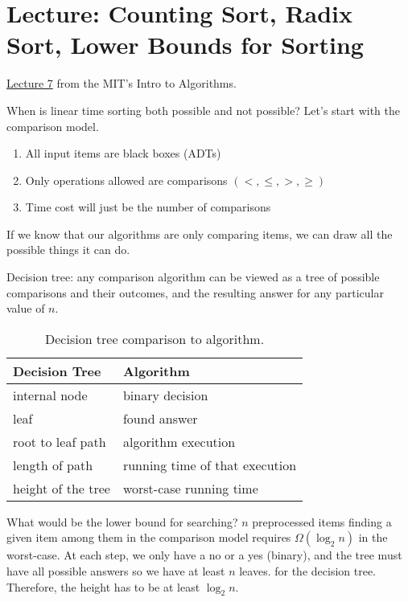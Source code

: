 \chapter{Lecture: Counting Sort, Radix Sort, Lower Bounds for Sorting}
\href{https://ocw.mit.edu/courses/electrical-engineering-and-computer-science/6-006-introduction-to-algorithms-fall-2011/lecture-videos/lecture-7-counting-sort-radix-sort-lower-bounds-for-sorting/}{Lecture 7} 
from the MIT's  Intro to Algorithms.

When is linear time sorting both possible and not possible? Let's start with the comparison model.
\begin{enumerate}[label=$\ast$]
	\item All input items are black boxes (ADTs)
	\item Only operations allowed are comparisons \((<, \leq, >, \geq)\)
	\item Time cost will just be the number of comparisons
\end{enumerate}
If we know that our algorithms are only comparing items, we can draw all the possible things it can do. 
\begin{definition}
	Decision tree: any comparison algorithm can be viewed as a tree of possible comparisons and their 
	outcomes, and the resulting answer for any particular value of \(n\).
\end{definition}
\begin{table}[h]
	\centering
	\begin{tabular}{l | l}
		Decision Tree & Algorithm \\
		\hline
		internal node & binary decision\\
		leaf & found answer\\
		root to leaf path & algorithm execution\\
		length of path & running time of that execution\\
		height of the tree & worst-case running time
	\end{tabular}
	\caption{Decision tree comparison to algorithm.}
	\label{tab7:decision_algo}
\end{table}
What would be the lower bound for searching? \(n\) preprocessed items finding a given item among them in 
the comparison model requires \(\Omega (\log_2 n)\) in the worst-case. At each step, we only have a no or a
yes (binary), and the tree must have all possible answers so we have at least \(n\) leaves. for the decision 
tree. Therefore, the height has to be at least \(\log_2 n\).

